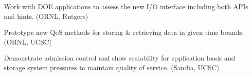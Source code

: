 \begin{tightItemize}
\item Work with DOE applications to assess 
the new I/O interface including both APIs and hints. (ORNL, Rutgers)
\item Prototype new QoS methods for storing \& retrieving data in given time bounds. (ORNL, UCSC)
\item Demonstrate admission control and show scalability for  application loads and 
 storage system pressures to maintain quality of
service. (Sandia, UCSC)
\end{tightItemize}
\normalsize
